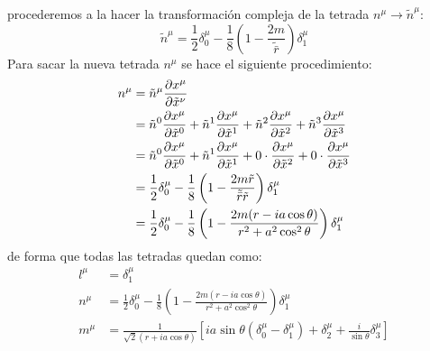 procederemos a la hacer la transformación compleja de la tetrada $n^\mu \to \tilde{n}^\mu$:
\begin{equation}
    \tilde{n}^\mu=\frac{1}{2}\delta_0^\mu-\frac{1}{8} \left(1 - \frac{2 m}{\tilde{\bar{r} }}\right)\delta_1^\mu 
\end{equation}
Para sacar la nueva tetrada $n^\mu$ se hace el siguiente procedimiento:
\begin{equation}
\begin{aligned}
    n^\mu&= \tilde{n}^\mu \frac{\partial x^\mu}{\partial \tilde{x}^\nu} \\
&= \tilde{n}^0 \frac{\partial x^\mu}{\partial \tilde{x}^0} + \tilde{n}^1 \frac{\partial x^\mu}{\partial \tilde{x}^1} + \tilde{n}^2 \frac{\partial x^\mu}{\partial \tilde{x}^2} + \tilde{n}^3 \frac{\partial x^\mu}{\partial \tilde{x}^3} \\
&= \tilde{n}^0 \frac{\partial x^\mu}{\partial \tilde{x}^0} + \tilde{n}^1 \frac{\partial x^\mu}{\partial \tilde{x}^1} +0 \cdot \frac{\partial x^\mu}{\partial \tilde{x}^2} + 0 \cdot \frac{\partial x^\mu}{\partial \tilde{x}^3} \\
& = \frac{1}{2}\delta^{\mu}_0 -\frac{1}{8} \left(1 - \frac{2 m\tilde{r}}{\tilde{\bar{r}}\tilde{r}}\right)\delta_1^\mu \\
& = \frac{1}{2}\delta^{\mu}_0 -\frac{1}{8} \left(1 - \frac{2 m(r-ia\cos\theta)}{r^2+a^2 \cos^2 \theta }\right)\delta_1^\mu \\
\end{aligned}    
\end{equation}
de forma que todas las tetradas quedan como:
\begin{equation}
    \begin{aligned}
        l^\mu & = \delta_1^\mu     \\
        n^\mu & = \frac{1}{2}\delta^{\mu}_0 -\frac{1}{8} \left(1 - \frac{2 m(r-ia\cos\theta)}{r^2+a^2 \cos^2 \theta }\right)\delta_1^\mu  \\
        m^\mu & = \frac{1}{\sqrt{2}(r + ia \cos \theta)} \left[ ia \sin \theta (\delta_0^\mu - \delta_1^\mu) + \delta_2^\mu + \frac{i}{\sin \theta} \delta_3^\mu \right]
    \end{aligned}
\end{equation}

